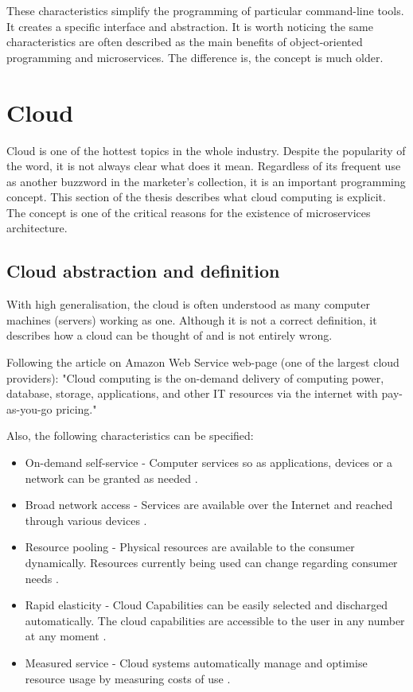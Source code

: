 These characteristics simplify the programming of particular command-line tools. It creates a specific interface and abstraction. It is worth noticing the same characteristics are often described as the main benefits of object-oriented programming and microservices. The difference is, the concept is much older. 

\section{Cloud}
\label{sec:cloud}

Cloud is one of the hottest topics in the whole industry. Despite the popularity of the word, it is not always clear what does it mean. Regardless of its frequent use as another buzzword in the marketer's collection, it is an important programming concept. This section of the thesis describes what cloud computing is explicit. The concept is one of the critical reasons for the existence of microservices architecture.

\subsection{Cloud abstraction and definition}
\label{subsec:cloudAbstraction}

With high generalisation, the cloud is often understood as many computer machines (servers) working as one. Although it is not a correct definition, it describes how a cloud can be thought of and is not entirely wrong.

Following the article on Amazon Web Service web-page (one of the largest cloud providers): "Cloud computing is the on-demand delivery of computing power, database, storage, applications, and other IT resources via the internet with pay-as-you-go pricing." \cite{aws-cloud-computing} 

Also, the following characteristics can be specified\cite{cloud-computing}:
\begin{itemize}
\item On-demand self-service - Computer services so as applications, devices or a network can be granted as needed \cite{cloud-computing}.
\item Broad network access -  Services are available over the Internet and reached through various devices \cite{cloud-computing}.
\item Resource pooling - Physical resources are available to the consumer dynamically. Resources currently being used can change regarding consumer needs \cite{cloud-computing}.
\item Rapid elasticity - Cloud Capabilities can be easily selected and discharged automatically. The cloud capabilities are accessible to the user in any number at any moment \cite{cloud-computing}.
\item Measured service - Cloud systems automatically manage and optimise resource usage by measuring costs of use \cite{cloud-computing}.

\end{itemize}

